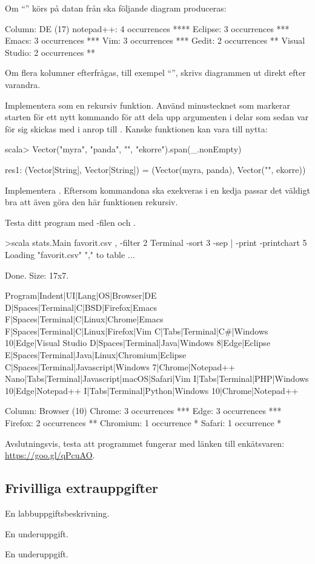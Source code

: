 Om ``'' körs på datan från  ska följande diagram produceras:
\begin{REPLnonum}
Column: DE (17)
notepad++: 4 occurrences
****
Eclipse: 3 occurrences
***
Emacs: 3 occurrences
***
Vim: 3 occurrences
***
Gedit: 2 occurrences
**
Visual Studio: 2 occurrences
**

\end{REPLnonum}
Om flera kolumner efterfrågas, till exempel ``'', skrivs diagrammen ut direkt efter varandra.

\Subtask Implementera  som en rekursiv funktion. Använd minustecknet som markerar starten för ett nytt kommando för att dela upp argumenten  i delar som sedan var för sig skickas med i anrop till . Kanske funktionen  kan vara till nytta:
\begin{REPLnonum}
scala> Vector("myra", "panda", "", "ekorre").span(_.nonEmpty)

res1: (Vector[String], Vector[String]) = (Vector(myra, panda),
                                         Vector("", ekorre))
\end{REPLnonum}

\Subtask Implementera . Eftersom kommandona ska exekveras i en kedja passar det väldigt bra att även göra den här funktionen rekursiv.

\Subtask Testa ditt program med -filen och .
\begin{REPLnonum}
>scala stats.Main favorit.csv , -filter 2 Terminal -sort 3 -sep | -print
-printchart 5
Loading "favorit.csv" "," to table ...

Done. Size: 17x7.

Program|Indent|UI|Lang|OS|Browser|DE
D|Spaces|Terminal|C|BSD|Firefox|Emacs
F|Spaces|Terminal|C|Linux|Chrome|Emacs
F|Spaces|Terminal|C|Linux|Firefox|Vim
C|Tabs|Terminal|C#|Windows 10|Edge|Visual Studio
D|Spaces|Terminal|Java|Windows 8|Edge|Eclipse
E|Spaces|Terminal|Java|Linux|Chromium|Eclipse
C|Spaces|Terminal|Javascript|Windows 7|Chrome|Notepad++
Nano|Tabs|Terminal|Javascript|macOS|Safari|Vim
I|Tabs|Terminal|PHP|Windows 10|Edge|Notepad++
I|Tabs|Terminal|Python|Windows 10|Chrome|Notepad++

Column: Browser (10)
Chrome: 3 occurrences
***
Edge: 3 occurrences
***
Firefox: 2 occurrences
**
Chromium: 1 occurrence
*
Safari: 1 occurrence
*

\end{REPLnonum}

\Task Avslutningsvis, testa att programmet fungerar med länken till enkätsvaren: \url{https://goo.gl/qPcuAO}.

\subsection{Frivilliga extrauppgifter}
    
\Task En labbuppgiftsbeskrivning. \TODO

\Subtask En underuppgift.

\Subtask En underuppgift.